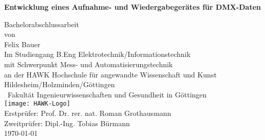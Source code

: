 
\begin{titlepage}
	\begin{center}
		\Huge
		\vspace*{2cm}
		\textbf{Entwicklung eines Aufnahme- und Wiedergabegerätes für DMX-Daten}
		
		\Large
		\vspace{2cm}
		Bachelorabschlussarbeit\\
		\vspace{.5cm}
		von\\
		\vspace{.5cm}
		Felix Bauer\\
		\vspace{1cm}
		Im Studiengang B.Eng Elektrotechnik/Informationstechnik\\ mit Schwerpunkt Mess- und Automatisierungstechnik\\
		\vspace{.5cm}
		an der HAWK Hochschule für angewandte Wissenschaft und Kunst\\ Hildesheim/Holzminden/Göttingen\\ Fakultät Ingenieurwissenschaften und Gesundheit in Göttingen\\
		\vspace{1.5cm}
		\texttt{[image: HAWK-Logo]}\\
		\vspace{1.5cm}
		Erstprüfer: Prof. Dr. rer. nat. Roman Grothausmann\\
		Zweitprüfer: Dipl.-Ing. Tobias Bürmann\\
		\vspace{.5cm}
		\today
		
		\vfill
	\end{center}
\end{titlepage}